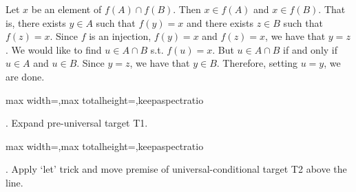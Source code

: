 \documentclass[a4paper,twoside,12pt]{article} %
\makeatletter
\DeclareRobustCommand{\_}{%
  \leavevmode\vbox{%
    \hrule\@width.4em
          \@height-.16ex
          \@depth\dimexpr.16ex+.28pt\relax}}
\newcommand\Tstrut{\rule{0pt}{2.4ex}}
\newcommand\Bstrut{\rule[-1.1ex]{0pt}{0pt}}
\newenvironment{fit}{\begin{adjustbox}{max width=\textwidth,max totalheight=\textheight,keepaspectratio}}{\end{adjustbox}}
\makeatother
\begin{document}
\begin{center}
\begin{minipage}{120mm}
Let $x$ be an element of $f(A)\cap f(B)$. Then $x\in f(A)$ and $x\in f(B)$. That is, there exists $y\in A$ such that $f(y) = x$ and there exists $z\in B$ such that $f(z) = x$. Since $f$ is an injection, $f(y) = x$ and $f(z) = x$, we have that $y = z$. We would like to find $u\in A\cap B$ s.t. $f(u) = x$. But $u\in A\cap B$ if and only if $u\in A$ and $u\in B$. Since $y = z$, we have that $y\in B$. Therefore, setting $u = y$, we are done.
\end{minipage}
\end{center}

\bigskip
\begin{steps}
\begin{fit}%
\end{fit}
\smallskip

. Expand pre-universal target T1.\nopagebreak[4] 
\marginpar{}\nopagebreak[4] 
\smallskip\nopagebreak[4] 

\begin{fit}%
\end{fit}
\smallskip

. Apply `let' trick and move premise of universal-conditional target T2 above the line.\nopagebreak[4] 
\nopagebreak[4] 
\smallskip\nopagebreak[4] 


\end{steps}
\end{document}
